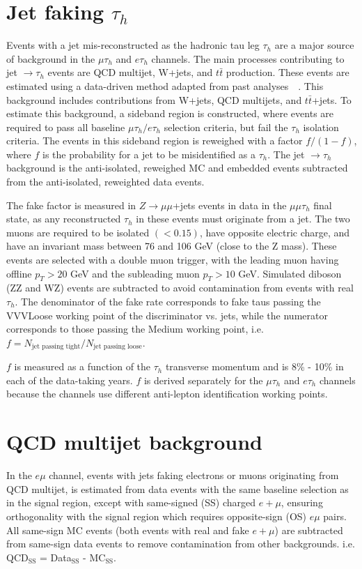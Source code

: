\section{Jet faking \texorpdfstring{$\tau_{h}$}{tauh}}
\label{section:ch-7-jet-faking-tauh-background}
Events with a jet mis-reconstructed as the hadronic tau leg $\tau_{h}$ are a major source of background in the $\mu\tau_{h}$ and $e\tau_{h}$ channels. The main processes contributing to jet $\rightarrow \tau_{h}$ events are QCD multijet, W+jets, and $t\bar{t}$ production. These events are estimated using a data-driven method adapted from past analyses~\cite{CMS-HIG-19-010}~\cite{CMS-HIG-17-024}. This background includes contributions from W+jets, QCD multijets, and $t\bar{t}$+jets. To estimate this background, a sideband region is constructed, where events are required to pass all baseline $\mu\tau_{h}/ e\tau_{h}$ selection criteria, but fail the $\tau_{h}$ isolation criteria. The events in this sideband region is reweighed with a factor $f/(1-f)$, where $f$ is the probability for a jet to be misidentified as a $\tau_{h}$. The jet $\rightarrow \tau_{h}$ background is the anti-isolated, reweighed MC and embedded events subtracted from the anti-isolated, reweighted data events.

The fake factor is measured in $Z \rightarrow \mu\mu$+jets events in data in the $\mu\mu\tau_{h}$ final state, as any reconstructed $\tau_{h}$ in these events must originate from a jet. The two muons are required to be isolated $(<0.15)$, have opposite electric charge, and have an invariant mass between 76 and 106 GeV (close to the Z mass). These events are selected with a double muon trigger, with the leading muon having offline $p_T > 20$ GeV and the subleading muon $p_{T} > 10$ GeV. Simulated diboson (ZZ and WZ) events are subtracted to avoid contamination from events with real $\tau_{h}$. The denominator of the fake rate corresponds to fake taus passing the VVVLoose working point of the discriminator vs. jets, while the numerator corresponds to those passing the Medium working point, i.e. $f = N_{\text{jet passing tight}}/ N_{\text{jet passing loose}}$.

$f$ is measured as a function of the $\tau_{h}$ transverse momentum and is 8\% - 10\% in each of the data-taking years. $f$ is derived separately for the $\mu\tau_{h}$ and $e\tau_{h}$ channels because the channels use different anti-lepton identification working points.

\section{QCD multijet background}
\label{section:ch-7-QCD-multijet-background}
In the $e\mu$ channel, events with jets faking electrons or muons originating from QCD multijet, is estimated from data events with the same baseline selection as in the signal region, except with same-signed (SS) charged $e+\mu$, ensuring orthogonality with the signal region which requires opposite-sign (OS) $e\mu$ pairs. All same-sign MC events (both events with real and fake $e+\mu$) are subtracted from same-sign data events to remove contamination from other backgrounds. i.e. QCD$_{\text{SS}}$ = Data$_{\text{SS}}$ - MC$_{\text{SS}}$.


